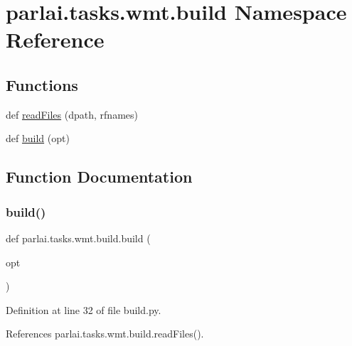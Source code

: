 \hypertarget{namespaceparlai_1_1tasks_1_1wmt_1_1build}{}\section{parlai.\+tasks.\+wmt.\+build Namespace Reference}
\label{namespaceparlai_1_1tasks_1_1wmt_1_1build}
\subsection*{Functions}
\begin{DoxyCompactItemize}
\item 
def \hyperlink{namespaceparlai_1_1tasks_1_1wmt_1_1build_a192eab3c7b1241809a1c134d54a9933f}{read\+Files} (dpath, rfnames)
\item 
def \hyperlink{namespaceparlai_1_1tasks_1_1wmt_1_1build_a824777527357c539f3e9d748efaa2f57}{build} (opt)
\end{DoxyCompactItemize}


\subsection{Function Documentation}
\mbox{\label{namespaceparlai_1_1tasks_1_1wmt_1_1build_a824777527357c539f3e9d748efaa2f57}} 
\subsubsection{\texorpdfstring{build()}{build()}}
{\footnotesize\ttfamily def parlai.\+tasks.\+wmt.\+build.\+build (\begin{DoxyParamCaption}\item[{}]{opt }\end{DoxyParamCaption})}



Definition at line 32 of file build.\+py.



References parlai.\+tasks.\+wmt.\+build.\+read\+Files().


